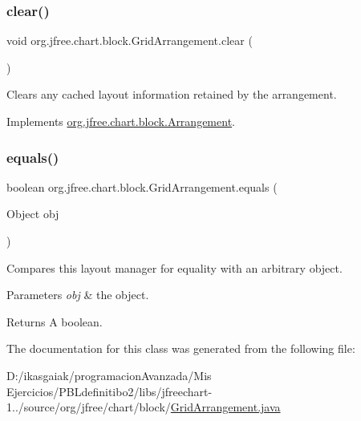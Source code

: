 \subsubsection{\texorpdfstring{clear()}{clear()}}
{\footnotesize\ttfamily void org.\+jfree.\+chart.\+block.\+Grid\+Arrangement.\+clear (\begin{DoxyParamCaption}{ }\end{DoxyParamCaption})}

Clears any cached layout information retained by the arrangement. 

Implements \mbox{\hyperlink{interfaceorg_1_1jfree_1_1chart_1_1block_1_1_arrangement_a4db8248d65d1c074b7cf5ecc35d0f097}{org.\+jfree.\+chart.\+block.\+Arrangement}}.

\mbox{\label{classorg_1_1jfree_1_1chart_1_1block_1_1_grid_arrangement_ae8bbb7f3822468c8081da1b20e5bd123}} 
\subsubsection{\texorpdfstring{equals()}{equals()}}
{\footnotesize\ttfamily boolean org.\+jfree.\+chart.\+block.\+Grid\+Arrangement.\+equals (\begin{DoxyParamCaption}\item[{Object}]{obj }\end{DoxyParamCaption})}

Compares this layout manager for equality with an arbitrary object.


\begin{DoxyParams}{Parameters}
{\em obj} & the object.\\
\hline
\end{DoxyParams}
\begin{DoxyReturn}{Returns}
A boolean. 
\end{DoxyReturn}


The documentation for this class was generated from the following file\+:\begin{DoxyCompactItemize}
\item 
D\+:/ikasgaiak/programacion\+Avanzada/\+Mis Ejercicios/\+P\+B\+Ldefinitibo2/libs/jfreechart-\/1../source/org/jfree/chart/block/\mbox{\hyperlink{_grid_arrangement_8java}{Grid\+Arrangement.\+java}}\end{DoxyCompactItemize}
